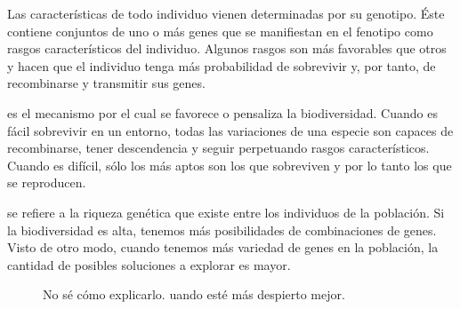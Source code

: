 
Las características de todo individuo vienen determinadas por su genotipo. Éste contiene conjuntos de uno o más genes que se manifiestan en el fenotipo como rasgos característicos del individuo. Algunos rasgos son más favorables que otros y hacen que el individuo tenga más probabilidad de sobrevivir y, por tanto, de recombinarse y transmitir sus genes.

 es el mecanismo por el cual se favorece o pensaliza la biodiversidad. Cuando es fácil sobrevivir en un entorno, todas las variaciones de una especie son capaces de recombinarse, tener descendencia y seguir perpetuando rasgos característicos. Cuando es difícil, sólo los más aptos son los que sobreviven y por lo tanto los que se reproducen.

 se refiere a la riqueza genética que existe entre los individuos de la población. Si la biodiversidad es alta, tenemos más posibilidades de combinaciones de genes. Visto de otro modo, cuando tenemos más variedad de genes en la población, la cantidad de posibles soluciones a explorar es mayor.

\begin{figure}[t]
	\caption[Efectos de la diferencia de biodiversidad en una población de individuos]{No sé cómo explicarlo. uando esté más despierto mejor.}
	\label{fig:different-levels-of-biodiversity}
\end{figure}

